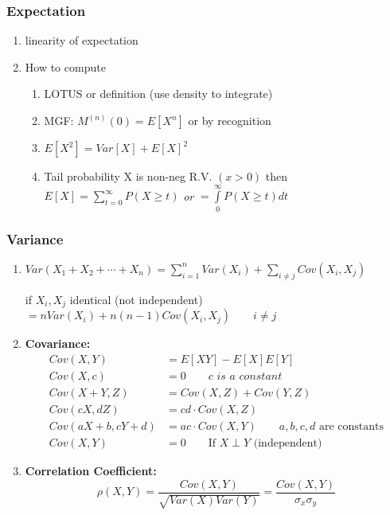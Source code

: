 \subsubsection*{Expectation}
\begin{enumerate}[label=\protect\circled{\arabic*}]
	\item linearity of expectation
	\item How to compute
	\begin{enumerate}
		\item LOTUS or definition (use density to integrate)
		\item MGF: $M^{(n)}(0) = E[X^n]$ or by recognition
		\item $E[X^2] = Var[X] + E[X]^2$
		\item Tail probability X is non-neg R.V. $(x>0)$ then $E[X] = \sum\limits_{t=0}^\infty P(X \geq t)$ \textit{or} $= \int\limits_0^\infty P(X \geq t) dt$
	\end{enumerate}
\end{enumerate}
\subsubsection*{Variance}
\begin{enumerate}[label=\protect\circled{\arabic*}]
	\item $Var(X_1 + X_2 + \cdots + X_n) = \sum\limits_{i=1}^n Var(X_i) + \sum\limits_{i \neq j} Cov(X_i, X_j)$
	\begin{center}
		if $X_i, X_j$ identical (not independent) $ = n Var(X_i) + n(n-1)Cov(X_i, X_j) \quad \quad i\neq j$\\
	\end{center}
	\item \textbf{Covariance: }
	\begin{align*}
		Cov(X,Y) & = E[XY] - E[X]E[Y]\\
		Cov(X,c) & = 0 \quad \quad c \textit{ is a constant}\\
		Cov(X+Y,Z) & = Cov(X,Z) + Cov(Y,Z)\\
		Cov(cX,dZ) & = cd \cdot Cov(X,Z)\\
		Cov(aX + b, cY + d) & = ac \cdot Cov(X,Y) \qquad a,b,c,d \text{ are constants}\\
		Cov(X,Y) & = 0 \qquad \text{If } X \perp Y \text{ (independent)}
	\end{align*}
	\item \textbf{Correlation Coefficient:}
	\begin{equation*}
		\rho(X,Y) = \frac{Cov(X,Y)}{\sqrt{Var(X) Var(Y)}} = \frac{Cov(X,Y)}{\sigma_x \sigma_y}
	\end{equation*}
\end{enumerate}
